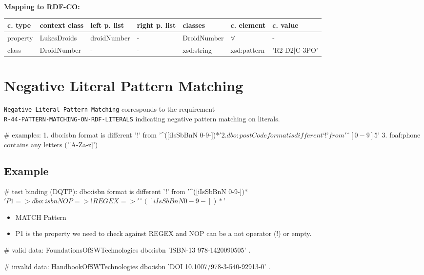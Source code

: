 \documentclass{llncs}
\newcommand{\ms}[1]{\texttt{#1}}
\newenvironment{gcotable}{
  \scriptsize
  \sffamily
  \vspace{0cm}
	\begin{center}
	\textbf{\vspace{0.4cm}Mapping to RDF-CO:} \\
  \begin{tabular}{l|l|l|l|l|l|l}
	\hline
  \textbf{c. type} & \textbf{context class} & \textbf{left p. list} & \textbf{right p. list} & \textbf{classes} & \textbf{c. element} & \textbf{c. value} \\
  \hline

}{
  \hline
  \end{tabular}
	\end{center}
}
\begin{document}
\begin{gcotable}
property & LukesDroids & droidNumber & - & DroidNumber & $\forall$ & - \\
class & DroidNumber & - & - & xsd:string & xsd:pattern & 'R2-D2$|$C-3PO' \\
\end{gcotable}

\section{Negative Literal Pattern Matching}

\ms{Negative Literal Pattern Matching} corresponds to the requirement \\
\ms{R-44-PATTERN-MATCHING-ON-RDF-LITERALS}
indicating negative pattern matching on literals.

\begin{ex}
# examples:
1. dbo:isbn format is different ’!’ from '^([iIsSbBnN 0-9-])*$'
2. dbo:postCode format is different ‘!’ from 'ˆ[0-9]{5}$'
3. foaf:phone contains any letters ('[A-Za-z]')
\end{ex}

\subsection{Example}

\begin{ex}
# test binding (DQTP):
dbo:isbn format is different ’!’ from '^([iIsSbBnN 0-9-])*$'

P1 => dbo:isbn
NOP => !
REGEX => 'ˆ([iIsSbBnN 0-9-])*$'
\end{ex}


\begin{itemize}
	\item MATCH Pattern \cite{Kontokostas2014} 
  \item P1 is the property we need to check against REGEX and
NOP can be a not operator (!) or empty.
\end{itemize}

\begin{ex}
# valid data:
FoundationsOfSWTechnologies
    dbo:isbn 'ISBN-13 978-1420090505' .
\end{ex}

\begin{ex}
# invalid data:
HandbookOfSWTechnologies
    dbo:isbn 'DOI 10.1007/978-3-540-92913-0' .
\end{ex}
\end{document}

